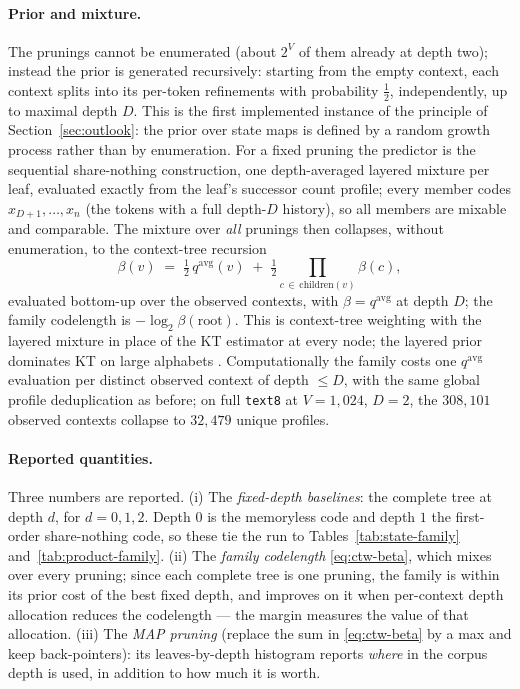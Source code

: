 \documentclass[11pt]{article}
\begin{document}
\paragraph{Prior and mixture.}
The prunings cannot be enumerated (about $2^{V}$ of them already at
depth two); instead the prior is generated recursively: starting from
the empty context, each context splits into its per-token refinements
with probability $\tfrac12$, independently, up to maximal depth $D$.
This is the first implemented instance of the principle of
Section~\ref{sec:outlook}: the prior over state maps is defined by a
random growth process rather than by enumeration.  For a fixed pruning
the predictor is the sequential share-nothing construction, one
depth-averaged
layered mixture per leaf, evaluated exactly from the leaf's successor
count profile; every member codes $x_{D+1},\dots,x_n$ (the tokens with a
full depth-$D$ history), so all members are mixable and comparable.  The
mixture over \emph{all} prunings then collapses, without enumeration, to
the context-tree recursion
\begin{equation}
\label{eq:ctw-beta}
  \beta(v) \;=\; \tfrac12\, q^{\mathrm{avg}}(v)
  \;+\; \tfrac12 \prod_{c \,\in\, \mathrm{children}(v)} \beta(c),
\end{equation}
evaluated bottom-up over the observed contexts, with
$\beta = q^{\mathrm{avg}}$ at depth $D$; the family codelength is
$-\log_2 \beta(\mathrm{root})$.  This is context-tree weighting with the
layered mixture in place of the KT estimator at every node; the layered
prior dominates KT on large alphabets \cite{layered2026}.
Computationally the family costs one
$q^{\mathrm{avg}}$ evaluation per distinct observed context of depth
$\le D$, with the same global profile deduplication as before; on full
\texttt{text8} at $V=1{,}024$, $D=2$, the $308{,}101$ observed contexts
collapse to $32{,}479$ unique profiles.

\paragraph{Reported quantities.}
Three numbers are reported.  (i) The \emph{fixed-depth baselines}: the
complete tree at depth $d$, for $d = 0, 1, 2$.  Depth $0$ is the
memoryless code and depth $1$ the first-order share-nothing code, so
these tie the run to Tables~\ref{tab:state-family}
and~\ref{tab:product-family}.  (ii) The \emph{family codelength}
\eqref{eq:ctw-beta}, which mixes over every pruning; since each
complete tree is one pruning, the family is within its prior cost of
the best fixed depth, and improves on it when per-context depth
allocation reduces the codelength --- the margin measures the value of
that allocation.  (iii) The \emph{MAP pruning} (replace the sum in
\eqref{eq:ctw-beta} by a max and keep back-pointers): its
leaves-by-depth histogram reports \emph{where} in the corpus depth is
used, in addition to how much it is worth.
\end{document}
